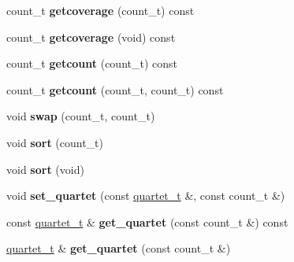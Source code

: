 \begin{DoxyCompactItemize}
\item 
\hypertarget{classLocus_a74a6a4a9b5821ed310759a61c99ffb23}{count\-\_\-t {\bfseries getcoverage} (count\-\_\-t) const }\label{classLocus_a74a6a4a9b5821ed310759a61c99ffb23}

\item 
\hypertarget{classLocus_a6b8241285e0abdb51fabf30e95a2af14}{count\-\_\-t {\bfseries getcoverage} (void) const }\label{classLocus_a6b8241285e0abdb51fabf30e95a2af14}

\item 
\hypertarget{classLocus_a7eb8ac8782d6bf39da9cce900fc7e1b2}{count\-\_\-t {\bfseries getcount} (count\-\_\-t) const }\label{classLocus_a7eb8ac8782d6bf39da9cce900fc7e1b2}

\item 
\hypertarget{classLocus_a15593537ffd1282834d7b97da48fb419}{count\-\_\-t {\bfseries getcount} (count\-\_\-t, count\-\_\-t) const }\label{classLocus_a15593537ffd1282834d7b97da48fb419}

\item 
\hypertarget{classLocus_af20da70ee14daf43d2fb00516f9e027c}{void {\bfseries swap} (count\-\_\-t, count\-\_\-t)}\label{classLocus_af20da70ee14daf43d2fb00516f9e027c}

\item 
\hypertarget{classLocus_a57060b5564af4de19b60a561e3c55d85}{void {\bfseries sort} (count\-\_\-t)}\label{classLocus_a57060b5564af4de19b60a561e3c55d85}

\item 
\hypertarget{classLocus_af2a9a5db3fac4c2ce7ad700eb5a9128e}{void {\bfseries sort} (void)}\label{classLocus_af2a9a5db3fac4c2ce7ad700eb5a9128e}

\item 
\hypertarget{classLocus_a5ac107da5d2f910bf168c92985ddbc44}{void {\bfseries set\-\_\-quartet} (const \hyperlink{structquartet}{quartet\-\_\-t} \&, const count\-\_\-t \&)}\label{classLocus_a5ac107da5d2f910bf168c92985ddbc44}

\item 
\hypertarget{classLocus_a55244bc358b4726242d678d17735726b}{const \hyperlink{structquartet}{quartet\-\_\-t} \& {\bfseries get\-\_\-quartet} (const count\-\_\-t \&) const }\label{classLocus_a55244bc358b4726242d678d17735726b}

\item 
\hypertarget{classLocus_a7f69001d4855521607141e0d61a4bea8}{\hyperlink{structquartet}{quartet\-\_\-t} \& {\bfseries get\-\_\-quartet} (const count\-\_\-t \&)}\label{classLocus_a7f69001d4855521607141e0d61a4bea8}


\end{DoxyCompactItemize}
